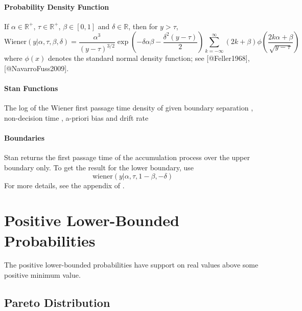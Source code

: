 \begin{description}
\subsubsection{Probability Density Function}


If $\alpha \in \mathbb{R}^+$, $\tau \in \mathbb{R}^+$, $\beta \in [0, 1]$ and $\delta \in \mathbb{R}$, then for $y > \tau$, \[ \text{Wiener}(y|\alpha, \tau, \beta, \delta) = \frac{\alpha^3}{(y-\tau)^{3/2}} \exp \! \left(- \delta \alpha \beta - \frac{\delta^2(y-\tau)}{2}\right) \sum_{k = - \infty}^{\infty} (2k + \beta) \phi \! \left(\frac{2k \alpha + \beta}{\sqrt{y - \tau}}\right) \] where $\phi(x)$ denotes the standard normal density function;  see [@Feller1968], [@NavarroFuss2009].




\subsubsection{Stan Functions} \begin{description}   {The log of the Wiener first passage time  density of  given boundary separation ,  non-decision time , a-priori bias  and  drift rate } \end{description}


\subsubsection{Boundaries}


Stan returns the first passage time of the accumulation process over the upper boundary only. To get the result for the lower boundary, use \[ \text{wiener}(y | \alpha, \tau, 1 - \beta, - \delta) \] For more details, see the appendix of \citet{Vandekerckhove-Wabersich:2014}.


\chapter{Positive Lower-Bounded Probabilities}


The positive lower-bounded probabilities have support on real values above some positive minimum value.


\section{Pareto Distribution}



\end{description}
